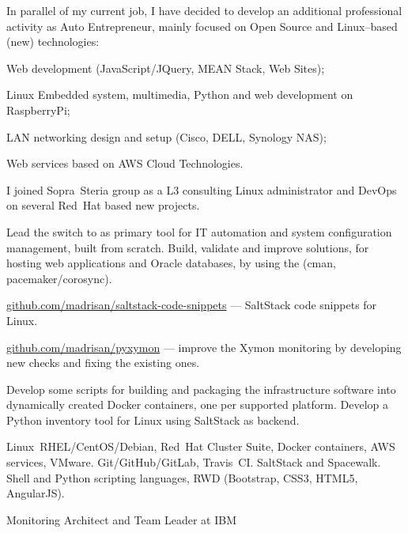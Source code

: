 In parallel of my current job, I have decided to develop an additional professional
activity as Auto Entrepreneur, mainly focused on Open Source and Linux--based (new) technologies:

\item{\bdot} Web development (JavaScript/JQuery, MEAN Stack, Web Sites);
\item{\bdot} Linux Embedded system, multimedia, Python and web development on RaspberryPi;
\item{\bdot} LAN networking design and setup (Cisco, DELL, Synology NAS);
\item{\bdot} Web services based on AWS Cloud Technologies.



I joined Sopra~Steria group as a L3 consulting Linux administrator and DevOps on
several Red~Hat based new projects.

\smallskip\noindent
\tasks
Lead the switch to  as primary tool for IT automation and system
configuration management, built from scratch.
Build, validate and improve  solutions,
for hosting web applications and Oracle databases, by using the
 (cman, pacemaker/corosync).

\smallskip\noindent
\software
\url{github.com/madrisan/saltstack-code-snippets} ---
SaltStack code snippets for Linux.

\tinyskip\noindent
\url{github.com/madrisan/pyxymon} ---
improve the Xymon monitoring by developing new checks and fixing the
existing ones.

\tinyskip\noindent
Develop some scripts for building and packaging the infrastructure software
into dynamically created Docker containers, one per supported platform.
Develop a Python inventory tool for Linux using SaltStack as backend.

\tinyskip\noindent
\technologies
Linux~RHEL/CentOS/Debian, Red~Hat Cluster Suite, Docker containers,
AWS services, VMware. Git/GitHub/GitLab, Travis~CI. SaltStack and Spacewalk.
Shell and Python scripting languages, RWD (Bootstrap, CSS3, HTML5, AngularJS).


   {Monitoring Architect and Team Leader at IBM}

